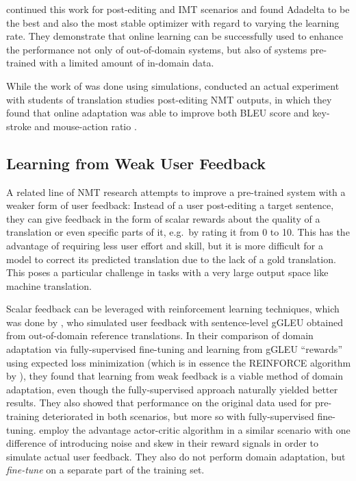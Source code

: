 \textcite{peris-2019} continued this work for post-editing and IMT scenarios and
found Adadelta to be the best and also the most stable optimizer with regard to
varying the learning rate. They demonstrate that online learning can be
successfully used to enhance the performance not only of out-of-domain systems,
but also of systems pre-trained with a limited amount of in-domain data.

While the work of \textcites{turchi-2017}{peris-2017}{peris-2019} was done using
simulations, \textcite{karimova-2018} conducted an actual experiment with
students of translation studies post-editing NMT outputs, in which they found
that online adaptation was able to improve both BLEU score and key-stroke and
mouse-action ratio \parencite[for KSMR cf.][]{barrachina-2009}.

\subsection{Learning from Weak User Feedback}

A related line of NMT research attempts to improve a pre-trained system with a
weaker form of user feedback: Instead of a user post-editing a target sentence,
they can give feedback in the form of scalar rewards about the quality of a
translation or even specific parts of it, e.g.\ by rating it from 0 to 10. This
has the advantage of requiring less user effort and skill, but it is more
difficult for a model to correct its predicted translation due to the lack of a
gold translation. This poses a particular challenge in tasks with a very large
output space like machine translation.

Scalar feedback can be leveraged with reinforcement learning techniques, which
was done by \textcite{kreutzer-2017}, who simulated user feedback with
sentence-level gGLEU \parencite{wu-2016} obtained from out-of-domain reference
translations. In their comparison of domain adaptation via fully-supervised
fine-tuning and learning from gGLEU \enquote{rewards} using expected loss
minimization (which is in essence the REINFORCE algorithm by
\textcite{williams-1992}), they found that learning from weak feedback is a
viable method of domain adaptation, even though the fully-supervised approach
naturally yielded better results. They also showed that performance on the
original data used for pre-training deteriorated in both scenarios, but more so
with fully-supervised fine-tuning. \textcite{nguyen-2017} employ the advantage
actor-critic algorithm \parencite{mnih-2016} in a similar scenario with one
difference of introducing noise and skew in their reward signals in order to
simulate actual user feedback. They also do not perform domain adaptation, but
\emph{fine-tune} on a separate part of the training set.

